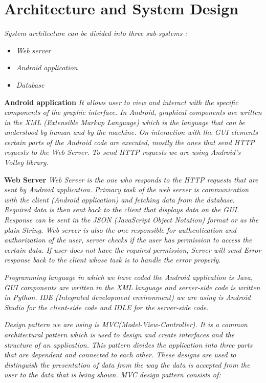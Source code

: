 \chapter{Architecture and System Design}

	\textit{ System architecture can be divided into three sub-systems :}
	\begin{itemize}
		\item 	\textit{Web server}
		\item 	\textit{Android application}
		\item 	\textit{Database}		
	\end{itemize}
		
		\textbf{Android application}
		\textit{It allows user to view and interact with the specific components of the graphic interface. In Android, graphical components are written in the XML (Extensible Markup Language) which is the language that can be understood by human and by the machine. On interaction with the GUI elements certain parts of the Android code are executed, mostly the ones that send HTTP requests to the Web Server. To send HTTP requests we are using Android’s Volley library.}

		\textbf{Web Server }
		\textit{Web Server is the one who responds to the HTTP requests that are sent by Android application. Primary task of the web server is communication with the client (Android application) and fetching data from the database. Required data is then sent back to the client that displays data on the GUI. Response can be sent in the JSON (JavaScript Object Notation) format or as the plain String. Web server is also the one responsible for authentication and authorization of the user, server checks if the user has permission to access the certain data. If user does not have the required permission, Server will send Error response back to the client whose task is to handle the error properly. }

		\textit{Programming language in which we have coded the Android application is Java, GUI components are written in the XML language and server-side code is written in Python. IDE (Integrated development environment) we are using is Android Studio for the client-side code and IDLE for the server-side code.}

		\textit{Design pattern we are using is MVC(Model-View-Controller). It is a common architectural pattern which is used to design and create interfaces and the structure of an application. This pattern divides the application into three parts that are dependent and connected to each other. These designs are used to distinguish the presentation of data from the way the data is accepted from the user to the data that is being shown. }
		\textit{MVC design pattern consists of: }
			
